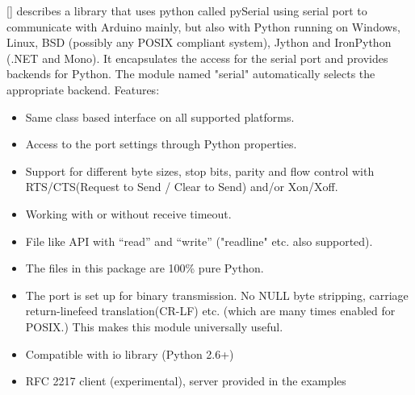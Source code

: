 \documentclass{acm_proc_article-sp}
\begin{document}
\newline
\newline
[] describes a library that uses python called pySerial using serial port to communicate with Arduino mainly, but also with Python running on Windows, Linux, BSD (possibly any POSIX compliant system), Jython and IronPython (.NET and Mono). It encapsulates the access for the serial port and provides backends for Python. The module named "serial" automatically selects the appropriate backend.
\newline
\newline
Features:
\begin{itemize}
\item Same class based interface on all supported platforms.
\item Access to the port settings through Python properties.
\item Support for different byte sizes, stop bits, parity and flow control with RTS/CTS(Request to Send / Clear to Send) and/or Xon/Xoff.
\item Working with or without receive timeout.
\item File like API with “read” and “write” ("readline" etc. also supported).
\item The files in this package are 100\% pure Python.
\item The port is set up for binary transmission. No NULL byte stripping, carriage return-linefeed translation(CR-LF) etc. (which are many times enabled for POSIX.) This makes this module universally useful.
\item Compatible with io library (Python 2.6+)
\item RFC 2217 client (experimental), server provided in the examples
\end{itemize}
\end{document}
